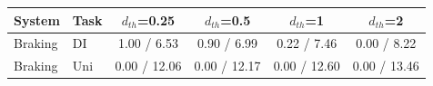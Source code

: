 \begin{tabular}{llcccc}
\hline
System & Task & $d_{th}$=0.25 & $d_{th}$=0.5 & $d_{th}$=1 & $d_{th}$=2 \\
\hline
Braking & DI & 1.00 / 6.53 & 0.90 / 6.99 & 0.22 / 7.46 & 0.00 / 8.22 \\
Braking & Uni & 0.00 / 12.06 & 0.00 / 12.17 & 0.00 / 12.60 & 0.00 / 13.46 \\
\hline
\end{tabular}
